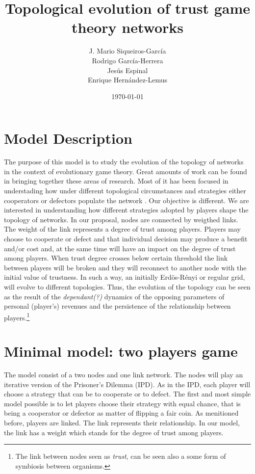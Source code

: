 \documentclass[11pt]{article}
\author{J. Mario Siqueiros-Garc\'ia\\ Rodrigo Garc\'ia-Herrera\\ Jes\'us Espinal\\ Enrique Hern\'andez-Lemus}
\title{Topological evolution of trust game theory networks}
\date{\today}
\begin{document}
\maketitle

\section{Model Description}

The purpose of this model is to study the evolution of the topology of networks in the context of evolutionary game theory. Great amounts of work can be found in bringing together these areas of
research. Most of it has been focused in understading how under different topological circumstances and strategies either cooperators or defectors populate the network \cite{Nowak1992, Hauert2004, Santos2005, Nowak2011}. Our objective is different. We are interested in understanding how different strategies adopted by players shape the topology of networks. In our proposal,  nodes are connected by weigthed links. The weight of the link represents a degree of trust among players. Players may choose to cooperate or defect and that individual decision may produce  a benefit and/or cost and, at the same time will have an impact on the degree of trust among players. When trust degree crosses below certain threshold the link between players will be broken and they will reconnect to another node with the initial value of trustness. In such a way, an initially Erd\"{o}s-R\'enyi or regular grid, will evolve to different topologies. Thus, the evolution of the topology can be seen as the result of the \emph{dependant(?)} dynamics of the opposing parameters of personal (player's) revenues and the persistence of the relationship between players.\footnote{The link between nodes seen as \emph{trust}, can be seen also a some form of symbiosis between organisms.}


\section{Minimal model: two players game}
The model consist of a two nodes and one link network. The nodes will play an iterative version of the Prisoner's Dilemma (IPD). As in the IPD, each player will choose a strategy that can be to cooperate or to defect. The first and most simple model possible is to let players choose their strategy with equal chance, that is being a cooperator or defector as matter of flipping a fair coin. As menitioned before, players are linked. The link represents their relationship. In our model, the link has a weight which stands for the degree of trust among players.\\
\end{document}
